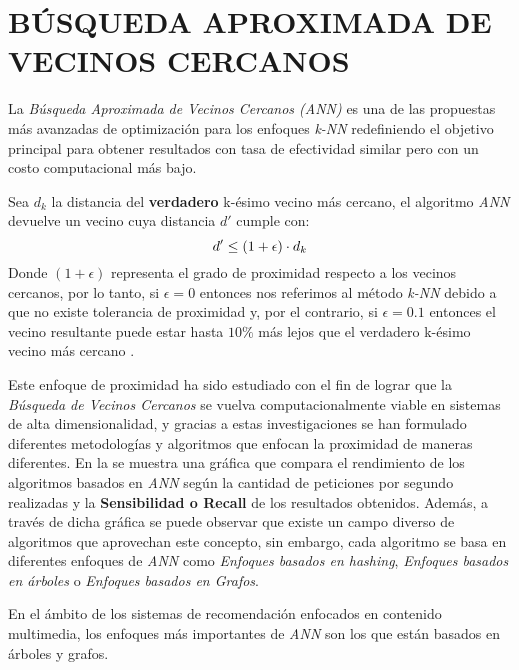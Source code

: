 \section{BÚSQUEDA APROXIMADA DE VECINOS CERCANOS}

La \textit{Búsqueda Aproximada de Vecinos Cercanos (ANN)} es una de las propuestas más avanzadas de optimización para los enfoques \textit{k-NN} redefiniendo el objetivo principal para obtener resultados con tasa de efectividad similar pero con un costo computacional más bajo.

\begin{definition}
    Sea $d_k$ la distancia del \textbf{verdadero} k-ésimo vecino más cercano, el algoritmo \textit{ANN} devuelve un vecino cuya distancia $d'$ cumple con: 
    \begin{equation}
        d' \leq (1 + \epsilon) \cdot d_k
        \addequation{Grado de Tolerancia del Algoritmo de Vecinos Aproximadamente más Cercanos}
    \end{equation}
    Donde $(1 + \epsilon)$ representa el grado de proximidad respecto a los vecinos cercanos, por lo tanto, si $\epsilon = 0$ entonces nos referimos al método \textit{k-NN} debido a que no existe tolerancia de proximidad y, por el contrario, si $\epsilon = 0.1$ entonces el vecino resultante puede estar hasta $10\%$ más lejos que el verdadero k-ésimo vecino más cercano \parencite{NIPS2004_1102a326}.
\end{definition}

Este enfoque de proximidad ha sido estudiado con el fin de lograr que la \textit{Búsqueda de Vecinos Cercanos} se vuelva computacionalmente viable en sistemas de alta dimensionalidad, y gracias a estas investigaciones se han formulado diferentes metodologías y algoritmos que enfocan la proximidad de maneras diferentes. En la  se muestra una gráfica que compara el rendimiento de los algoritmos basados en \textit{ANN} según la cantidad de peticiones por segundo realizadas y la \textbf{Sensibilidad o Recall} de los resultados obtenidos. Además, a través de dicha gráfica se puede observar que existe un campo diverso de algoritmos que aprovechan este concepto, sin embargo, cada algoritmo se basa en diferentes enfoques de \textit{ANN} como \textit{Enfoques basados en hashing}, \textit{Enfoques basados en árboles} o \textit{Enfoques basados en Grafos}.

En el ámbito de los sistemas de recomendación enfocados en contenido multimedia, los enfoques más importantes de \textit{ANN} son los que están basados en árboles y grafos.

